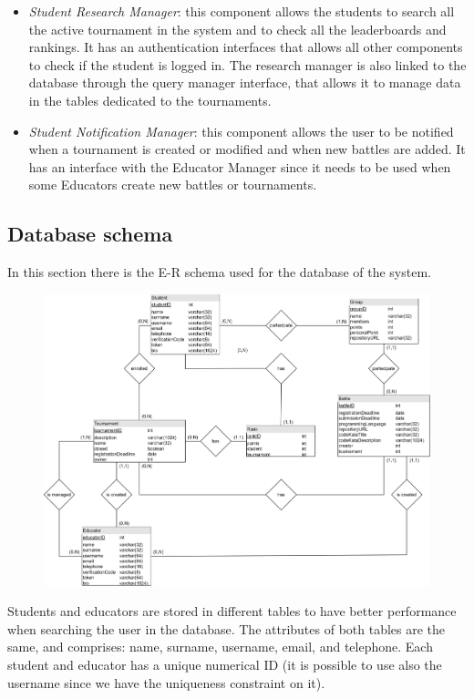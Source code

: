 \documentclass[12pt, a4paper]{report}
\begin{document}
\begin{itemize}
        \item \textit{Student Research Manager}: this component allows the students to search all the active tournament in the system and to check all the leaderboards and rankings. 
            It has an authentication interfaces that allows all other components to check if the student is logged in.
            The research manager is also linked to the database through the query manager interface, that allows it to manage data in the tables dedicated to the tournaments.
        \item \textit{Student Notification Manager}: this component allows the user to be notified when a tournament is created or modified and when new battles are added. 
            It has an interface with the Educator Manager since it needs to be used when some Educators create new battles or tournaments.
    \end{itemize}

    \newpage
    \subsection{Database schema}
    In this section there is the E-R schema used for the database of the system. 
    \begin{figure}[H]
        \centering
        \includegraphics[width=0.9\linewidth]{images/db.png}
    \end{figure}
    Students and educators are stored in different tables to have better performance when searching the user in the database.
    The attributes of both tables are the same, and comprises: name, surname, username, email, and telephone. 
    Each student and educator has a unique numerical ID (it is possible to use also the username since we have the uniqueness constraint on it). 
\end{document}
